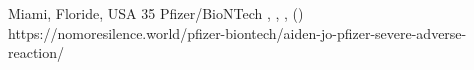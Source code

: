           {Miami, Floride, USA}
          {35}
          {Pfizer/BioNTech}
          {}
          {
            ,
            ,
            ,
             ()
          }
          {https://nomoresilence.world/pfizer-biontech/aiden-jo-pfizer-severe-adverse-reaction/}

